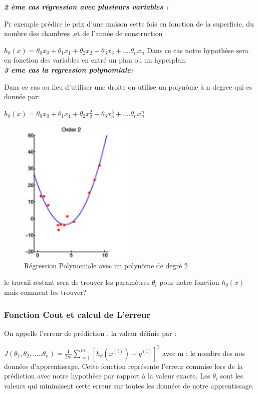 \textbf{\emph{2 ème cas régression avec plusieurs variables :}}

Pr exemple prédire le prix d'une maison cette fois en fonction de la superficie, du nombre des chambres ,et de l'année de construction

${h}_{\theta}\left(x\right)={\theta }_{0}{x}_{0}+{\theta }_{1}{x}_{1}+{\theta }_{2}{x}_{2}+{\theta }_{3}{x}_{3}+....{\theta }_{n}{x}_{n}$
Dans ce cas notre hypothèse sera en fonction des variables en entré un plan ou un hyperplan.\\

\textbf{\emph{3 eme cas la regression polynomiale:}}

Dans ce cas au lieu d'utiliser une droite on utilise un polynôme à n degree qui es donnée par:

${h}_{\theta}\left(x\right)={\theta }_{0}{x}_{0}+{\theta }_{1}{x}_{1}+{\theta }_{2}{x}_{2}^{2}+{\theta }_{3}{x}_{3}^{3}+....{\theta }_{n}{x}_{n}^{n}$
\begin{figure}[ht]
	\centering
	\includegraphics[width=0.5\textwidth]{fig/regressionPlokynome.png}
	\caption[Short caption]{Régression Polynomiale avec un polynôme de degré 2}
	\label{fig:image2}
\end{figure}
le travail restant sera de trouver les paramètres ${\theta }_{i}$ pour notre fonction  ${h}_{\theta}\left(x\right)$ mais comment les trouver?

\subsubsection{Fonction Cout et calcul de L'erreur }
On appelle l'erreur de prédiction , la valeur définie par   :

 $J\left({\theta }_{1},{\theta }_{2},.....{\theta }_{n}\right)=\frac{1}{2m}\sum _{=1}^{m}{\left[{h}_{\theta}\left({x}^{(i)}\right) - {y}^{(i)}\right]}^2$
 avec m : le nombre des nos données d'apprentissage.
 Cette fonction représente l'erreur commise lors de la prédiction avec notre hypothèse par rapport à la valeur exacte.
 Les  ${\theta }_{i}$ sont les valeurs qui minimisent cette erreur sur toutes les données de notre apprentissage.
 
